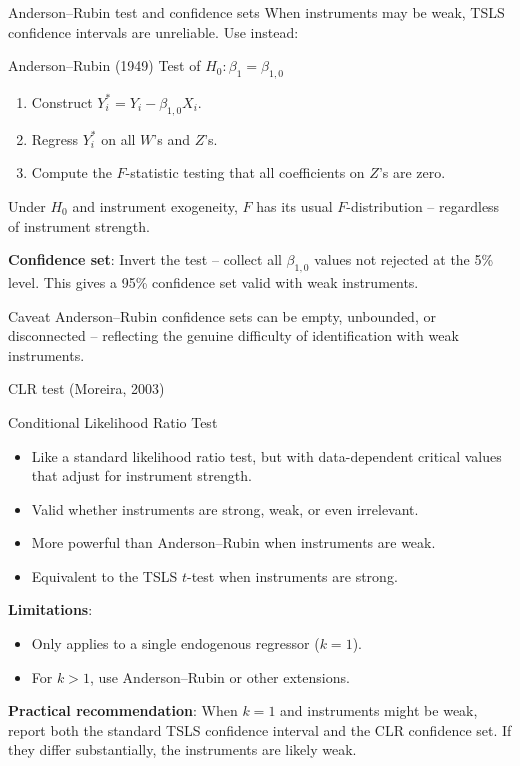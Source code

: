 \documentclass[10pt]{beamer}
\begin{document}
\begin{frame}{Anderson--Rubin test and confidence sets}
\label{slide:anderson_rubin}
When instruments may be weak, TSLS confidence intervals are unreliable. Use instead:

\begin{block}{Anderson--Rubin (1949) Test of $H_0: \beta_1 = \beta_{1,0}$}
\begin{enumerate}
  \item Construct $Y_i^* = Y_i - \beta_{1,0}X_i$.
  \item Regress $Y_i^*$ on all $W$'s and $Z$'s.
  \item Compute the $F$-statistic testing that all coefficients on $Z$'s are zero.
\end{enumerate}
Under $H_0$ and instrument exogeneity, $F$ has its usual $F$-distribution -- \alert{regardless of instrument strength}.
\end{block}

\pause
\textbf{Confidence set}: Invert the test -- collect all $\beta_{1,0}$ values not rejected at the 5\% level. This gives a 95\% confidence set valid with weak instruments.

\pause
\vspace{0.3em}
\begin{alertblock}{Caveat}
Anderson--Rubin confidence sets can be empty, unbounded, or disconnected -- reflecting the genuine difficulty of identification with weak instruments.
\end{alertblock}
\end{frame}

\begin{frame}{CLR test (Moreira, 2003)}
\label{slide:clr}
\begin{block}{Conditional Likelihood Ratio Test}
\begin{itemize}
  \item Like a standard likelihood ratio test, but with \alert{data-dependent critical values} that adjust for instrument strength.
  \item Valid whether instruments are strong, weak, or even irrelevant.
  \item More \alert{powerful} than Anderson--Rubin when instruments are weak.
  \item Equivalent to the TSLS $t$-test when instruments are strong.
\end{itemize}
\end{block}

\pause
\textbf{Limitations}:
\begin{itemize}
  \item Only applies to a single endogenous regressor ($k=1$).
  \item For $k > 1$, use Anderson--Rubin or other extensions.
\end{itemize}

\pause
\vspace{0.3em}
\textbf{Practical recommendation}: When $k=1$ and instruments might be weak, report both the standard TSLS confidence interval and the CLR confidence set. If they differ substantially, the instruments are likely weak.
\end{frame}
\end{document}
